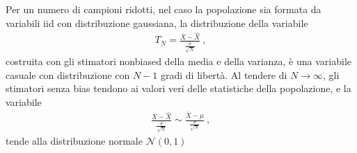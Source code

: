 \documentclass[letterpaper,10pt,italian]{jupyterBook}
\begin{document}
\sphinxAtStartPar
Per un numero di campioni ridotti, nel caso la popolazione sia formata da variabili iid con distribuzione gaussiana, la distribuzione della variabile
\begin{equation*}
\begin{split}T_N = \frac{\bar{X} - \hat{X}}{\frac{\hat{\sigma}}{\sqrt{N}}} \ ,\end{split}
\end{equation*}
\sphinxAtStartPar
costruita con gli stimatori non\sphinxhyphen{}biased della media e della varianza, è una variabile casuale con distribuzione  con \(N-1\) gradi di libertà. Al tendere di \(N \rightarrow \infty\), gli stimatori senza bias tendono ai valori veri delle statistiche della popolazione, e la variabile
\begin{equation*}
\begin{split}\frac{\bar{X} - \hat{X}}{\frac{\hat{\sigma}}{\sqrt{N}}} \sim \frac{\bar{X} - \mu}{\frac{\sigma}{\sqrt{N}}} \ ,\end{split}
\end{equation*}
\sphinxAtStartPar
tende alla distribuzione normale \(\mathscr{N}(0,1)\)
\end{document}
